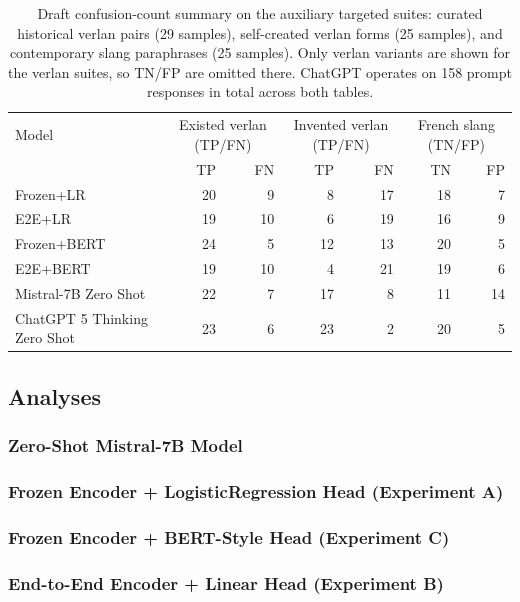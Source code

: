 \documentclass[12pt]{article}
\begin{document}
\begin{table}[H]
    \centering
    \footnotesize
    \begin{tabular}{lrrrrrr}
        \hline
        Model & \multicolumn{2}{c}{Existed verlan (TP/FN)} & \multicolumn{2}{c}{Invented verlan (TP/FN)} & \multicolumn{2}{c}{French slang (TN/FP)} \\
         & TP & FN & TP & FN & TN & FP \\
        \hline
        Frozen+LR & 20 & 9 & 8 & 17 & 18 & 7 \\
        E2E+LR & 19 & 10 & 6 & 19 & 16 & 9 \\
        Frozen+BERT & 24 & 5 & 12 & 13 & 20 & 5 \\
        E2E+BERT & 19 & 10 & 4 & 21 & 19 & 6 \\
        Mistral-7B Zero Shot & 22 & 7 & 17 & 8 & 11 & 14 \\
        ChatGPT 5 Thinking Zero Shot & 23 & 6 & 23 & 2 & 20 & 5 \\
        \hline
    \end{tabular}
    \caption{Draft confusion-count summary on the auxiliary targeted suites: curated historical verlan pairs (29 samples), self-created verlan forms (25 samples), and contemporary slang paraphrases (25 samples).  Only verlan variants are shown for the verlan suites, so TN/FP are omitted there.  ChatGPT operates on 158 prompt responses in total across both tables.}
    \label{tab:aux-test-confusion-draft}
\end{table}

\subsection{Analyses}
\subsubsection{Zero-Shot Mistral-7B Model}
\subsubsection{Frozen Encoder + LogisticRegression Head (Experiment A)}
\subsubsection{Frozen Encoder + BERT-Style Head (Experiment C)}
\subsubsection{End-to-End Encoder + Linear Head (Experiment B)}
\end{document}
